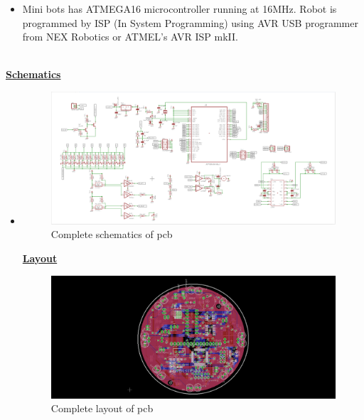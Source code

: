 \documentclass[a4paper,12pt,oneside]{book}
\begin{document}
	\begin{itemize}
	\item{Mini bots has ATMEGA16 microcontroller running at 16MHz. Robot is programmed by ISP (In System Programming) using AVR USB programmer from NEX
		Robotics or ATMEL’s AVR ISP mkII.}
	\end{itemize}

	\hfill\\
	\underline{\textbf{\Large{Schematics}}}
	\begin{itemize}
		\item {}
	\begin{figure}[h!]
		\caption{Complete schematics of pcb}
		\includegraphics[width=\textwidth]{./HardwareManual/capture.png}
	\end{figure}	

	\underline{\textbf{\Large{Layout}}}

	\begin{figure}[h!]
		\caption{Complete layout of pcb}
		\includegraphics[width=\textwidth]{./HardwareManual/capture1.png}
	\end{figure}		


\end{itemize}
\end{document}
